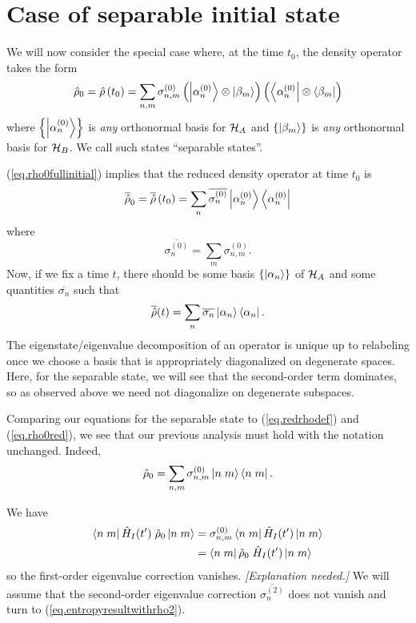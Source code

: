 \section{Case of separable initial state}\label{sec.separablestate}

We will now consider the special case where, at the time \(t_0\), the density operator takes the form
\begin{equation}\label{eq.rho0fullinitial}
\hat{\rho}_0 = \hat{\rho}\left(t_0\right) = \sum_{n,m} \sigma_{n,m}^{(0)} \left(\left|\alpha_n^{(0)}\right\rangle\otimes\left|\beta_m\right\rangle\right) \left(\left\langle\alpha_n^{(0)}\right|\otimes\left\langle\beta_m\right|\right)
\end{equation}
where \(\left\{\left|\alpha_n^{(0)}\right\rangle\right\}\) is \emph{any} orthonormal basis for \(\mathcal{H}_A\) and \(\left\{\left|\beta_m\right\rangle\right\}\) is \emph{any} orthonormal basis for \(\mathcal{H}_B\). We call such states ``separable states''.

(\ref{eq.rho0fullinitial}) implies that the reduced density operator at time \(t_0\) is
\[
\overline{\hat{\rho}}_0 = \overline{\hat{\rho}}\left(t_0\right) = \sum_n \overline{\sigma_{n}^{(0)}} \left|\alpha_n^{(0)}\right\rangle\left\langle\alpha_n^{(0)}\right|
\]
where
\[
\overline{\sigma_n^{(0)}} = \sum_m \sigma_{n,m}^{(0)}.
\]
Now, if we fix a time \(t\), there should be some basis \(\{\left|\alpha_n\right\rangle\}\) of \(\mathcal{H}_A\) and some quantities \(\overline{\sigma_n}\) such that
\[
\overline{\hat{\rho}}(t) = \sum_n \overline{\sigma_n} \left|\alpha_n\right\rangle\left\langle\alpha_n\right|.
\]
The eigenstate/eigenvalue decomposition of an operator is unique up to relabeling once we choose a basis that is appropriately diagonalized on degenerate spaces. Here, for the separable state, we will see that the second-order term dominates, so as observed above we need not diagonalize on degenerate subspaces.

Comparing our equations for the separable state to (\ref{eq.redrhodef}) and (\ref{eq.rho0red}), we see that our previous analysis must hold with the notation unchanged. Indeed,
\begin{equation}
\label{eq.rho0full}
\hat{\rho}_0 = \sum_{n,m} \sigma_{n,m}^{(0)} \left|n\;m\right\rangle\left\langle n\;m\right|.
\end{equation}

We have
\begin{align*}
\left\langle n\;m\right| \hat{H}_I(t^\prime) \;\hat{\rho}_0 \left|n\;m\right\rangle 
&= 
\sigma_{n,m}^{(0)} \left\langle n\;m\right| \hat{H}_I(t^\prime) \left|n\;m\right\rangle 
\\&=
 \left\langle n\;m\right| \hat{\rho}_0 \;\hat{H}_I(t^\prime) \left|n\;m\right\rangle 
\end{align*}
so the first-order eigenvalue correction vanishes. \emph{[Explanation needed.]} We will assume that the second-order eigenvalue correction \(\overline{\sigma_n^{(2)}}\) does not vanish and turn to (\ref{eq.entropyresultwithrho2}).

